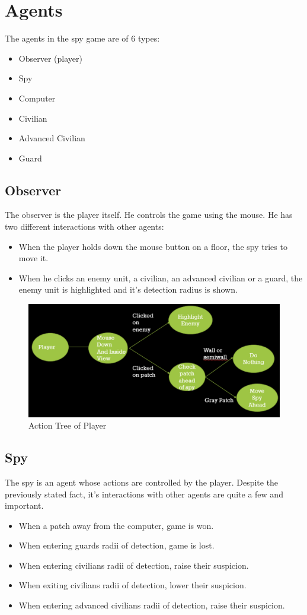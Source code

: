 \documentclass[12pt]{article}
\begin{document}
\section{Agents}
The agents in the spy game are of 6 types:
\begin{itemize}
\item Observer (player)
\item Spy
\item Computer
\item Civilian
\item Advanced Civilian
\item Guard
\end{itemize}
\newpage
\subsection{Observer}
The observer is the player itself. He controls the game using the mouse. He has two different interactions with other agents:
\begin{itemize}
\item When the player holds down the mouse button on a floor, the spy tries to move it.
\item When he clicks an enemy unit, a civilian, an advanced civilian or a guard, the enemy unit is highlighted and it's detection radius is shown.
\end{itemize}
\vspace{3cm}
\begin{figure}[h]
\includegraphics[scale=.8]{Picture4.png}
\caption{Action Tree of Player}
\centering
\end{figure}
\newpage
\subsection{Spy}
The spy is an agent whose actions are controlled by the player. Despite the previously stated fact, it's interactions with other agents are quite a few and important.
\begin{itemize}
\item When a patch away from the computer, game is won.
\item When entering guards radii of detection, game is lost.
\item When entering civilians radii of detection, raise their suspicion.
\item When exiting civilians radii of detection, lower their suspicion.
\item When entering advanced civilians radii of detection, raise their suspicion.
\end{itemize}
\end{document}
